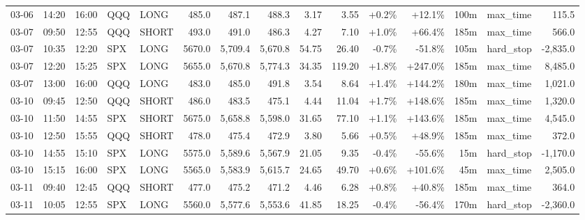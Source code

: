 \documentclass[11pt,a4paper,twoside]{article}
\begin{document}
\begin{landscape}
\begin{center}
\begin{longtable}{>{\color{txtmain}}l l l l l r r r r r r r r >{\color{txtmain}}l r}
03-06 & 14:20 & 16:00 & QQQ & LONG & 485.0 & 487.1 & 488.3 & 3.17 & 3.55 & \textcolor{wingreen}{+0.2\%} & \textcolor{wingreen}{+12.1\%} & 100m & max\_time & \textcolor{wingreen}{115.5} \\
03-07 & 09:50 & 12:55 & QQQ & SHORT & 493.0 & 491.0 & 486.3 & 4.27 & 7.10 & \textcolor{wingreen}{+1.0\%} & \textcolor{wingreen}{+66.4\%} & 185m & max\_time & \textcolor{wingreen}{566.0} \\
03-07 & 10:35 & 12:20 & SPX & LONG & 5670.0 & 5,709.4 & 5,670.8 & 54.75 & 26.40 & \textcolor{lossred}{-0.7\%} & \textcolor{lossred}{-51.8\%} & 105m & hard\_stop & \textcolor{lossred}{-2,835.0} \\
03-07 & 12:20 & 15:25 & SPX & LONG & 5655.0 & 5,670.8 & 5,774.3 & 34.35 & 119.20 & \textcolor{wingreen}{+1.8\%} & \textcolor{wingreen}{+247.0\%} & 185m & max\_time & \textcolor{wingreen}{8,485.0} \\
03-07 & 13:00 & 16:00 & QQQ & LONG & 483.0 & 485.0 & 491.8 & 3.54 & 8.64 & \textcolor{wingreen}{+1.4\%} & \textcolor{wingreen}{+144.2\%} & 180m & max\_time & \textcolor{wingreen}{1,021.0} \\
03-10 & 09:45 & 12:50 & QQQ & SHORT & 486.0 & 483.5 & 475.1 & 4.44 & 11.04 & \textcolor{wingreen}{+1.7\%} & \textcolor{wingreen}{+148.6\%} & 185m & max\_time & \textcolor{wingreen}{1,320.0} \\
03-10 & 11:50 & 14:55 & SPX & SHORT & 5675.0 & 5,658.8 & 5,598.0 & 31.65 & 77.10 & \textcolor{wingreen}{+1.1\%} & \textcolor{wingreen}{+143.6\%} & 185m & max\_time & \textcolor{wingreen}{4,545.0} \\
03-10 & 12:50 & 15:55 & QQQ & SHORT & 478.0 & 475.4 & 472.9 & 3.80 & 5.66 & \textcolor{wingreen}{+0.5\%} & \textcolor{wingreen}{+48.9\%} & 185m & max\_time & \textcolor{wingreen}{372.0} \\
03-10 & 14:55 & 15:10 & SPX & LONG & 5575.0 & 5,589.6 & 5,567.9 & 21.05 & 9.35 & \textcolor{lossred}{-0.4\%} & \textcolor{lossred}{-55.6\%} & 15m & hard\_stop & \textcolor{lossred}{-1,170.0} \\
03-10 & 15:15 & 16:00 & SPX & LONG & 5565.0 & 5,583.9 & 5,615.7 & 24.65 & 49.70 & \textcolor{wingreen}{+0.6\%} & \textcolor{wingreen}{+101.6\%} & 45m & max\_time & \textcolor{wingreen}{2,505.0} \\
03-11 & 09:40 & 12:45 & QQQ & SHORT & 477.0 & 475.2 & 471.2 & 4.46 & 6.28 & \textcolor{wingreen}{+0.8\%} & \textcolor{wingreen}{+40.8\%} & 185m & max\_time & \textcolor{wingreen}{364.0} \\
03-11 & 10:05 & 12:55 & SPX & LONG & 5560.0 & 5,577.6 & 5,553.6 & 41.85 & 18.25 & \textcolor{lossred}{-0.4\%} & \textcolor{lossred}{-56.4\%} & 170m & hard\_stop & \textcolor{lossred}{-2,360.0} \\

\end{longtable}
\end{center}
\end{landscape}
\end{document}
